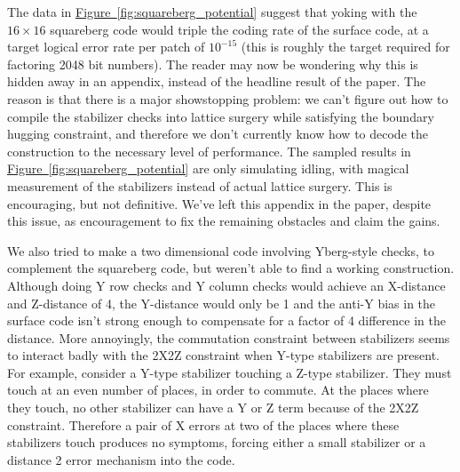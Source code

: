 \documentclass[onecolumn,unpublished,a4paper]{quantumarticle}
\theoremstyle{definition}
\theoremstyle{definition}
\theoremstyle{definition}
\newcommand{\fig}[1]{\hyperref[fig:#1]{Figure~\ref*{fig:#1}}}
\begin{document}
The data in \fig{squareberg_potential} suggest that yoking with the $16 \times 16$ squareberg code would triple the coding rate of the surface code, at a target logical error rate per patch of $10^{-15}$ (this is roughly the target required for factoring 2048 bit numbers).
The reader may now be wondering why this is hidden away in an appendix, instead of the headline result of the paper.
The reason is that there is a major showstopping problem: we can't figure out how to compile the stabilizer checks into lattice surgery while satisfying the boundary hugging constraint, and therefore we don't currently know how to decode the construction to the necessary level of performance.
The sampled results in \fig{squareberg_potential} are only simulating idling, with magical measurement of the stabilizers instead of actual lattice surgery.
This is encouraging, but not definitive.
We've left this appendix in the paper, despite this issue, as encouragement to fix the remaining obstacles and claim the gains.

We also tried to make a two dimensional code involving Yberg-style checks, to complement the squareberg code, but weren't able to find a working construction.
Although doing Y row checks and Y column checks would achieve an X-distance and Z-distance of 4, the Y-distance would only be 1 and the anti-Y bias in the surface code isn't strong enough to compensate for a factor of 4 difference in the distance.
More annoyingly, the commutation constraint between stabilizers seems to interact badly with the 2X2Z constraint when Y-type stabilizers are present.
For example, consider a Y-type stabilizer touching a Z-type stabilizer.
They must touch at an even number of places, in order to commute.
At the places where they touch, no other stabilizer can have a Y or Z term because of the 2X2Z constraint.
Therefore a pair of X errors at two of the places where these stabilizers touch produces no symptoms, forcing either a small stabilizer or a distance 2 error mechanism into the code.
\end{document}
